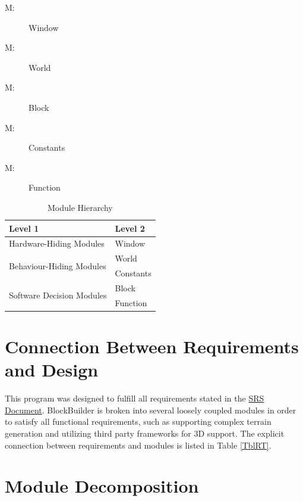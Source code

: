 \documentclass[12pt, titlepage]{article}
\newcounter{mnum}
\newcommand{\mthemnum}{M\themnum}
\begin{document}
\begin{description}
\item [ \mthemnum \label{mWindow}:] Window
\item [ \mthemnum \label{mWorld}:] World
\item [ \mthemnum \label{mBlock}:] Block
\item [ \mthemnum \label{mConst}:] Constants
\item [ \mthemnum \label{mFunction}:] Function
\end{description}


\begin{table}[h!]
\centering
\begin{tabular}{p{} p{}}
\toprule
\textbf{Level 1} & \textbf{Level 2}\\
\midrule

{Hardware-Hiding Modules} & Window\\
\midrule

\multirow{2}{0.3\textwidth}{Behaviour-Hiding Modules} & World\\
~ & Constants\\

\midrule
\multirow{2}{0.3\textwidth}{Software Decision Modules} & Block\\
~ & Function\\
\bottomrule

\end{tabular}
\caption{Module Hierarchy}
\label{TblMH}
\end{table}

\section{Connection Between Requirements and Design} \label{SecConnection}

This program was designed to fulfill all requirements stated in the \href{https://gitlab.cas.mcmaster.ca/lucenta/3XA3/blob/master/Doc/SRS/SRS.pdf}{SRS Document}. BlockBuilder is broken into several loosely coupled modules in order to satisfy all functional requirements, such as supporting complex terrain generation and utilizing third party frameworks for 3D support. The explicit connection between requirements and modules is listed in Table \ref{TblRT}.

\section{Module Decomposition} \label{SecMD}
\end{document}
